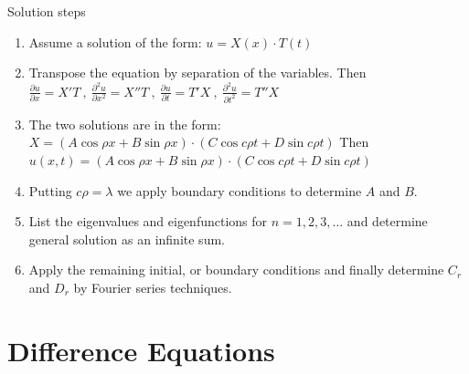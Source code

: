 \documentclass[12pt]{article}
\begin{document}
\begin{flushleft}
	\textbullet \quad Solution steps 
	\begin{enumerate}
	\item Assume a solution of the form: $u=X(x) \cdot T(t)$ 
	\item Transpose the equation by separation of the variables. Then $\displaystyle \frac{\partial u}{\partial x} = X'T \ , \ \frac{\partial^2 u}{\partial x^2} = X''T \ , \ \frac{\partial u}{\partial t} = T'X \ , \ \frac{\partial^2 u}{\partial t^2} = T''X$ 
	\item The two solutions are in the form: $\displaystyle X = (A \cos \rho x + B\sin \rho x) \cdot ( C\cos c \rho t + D \sin c \rho t) $ \linebreak 
	Then $\displaystyle u(x,t) = (A \cos \rho x + B \sin \rho x) \cdot ( C \cos c \rho t + D \sin c \rho t) $ 
	\item Putting $c \rho = \lambda$ we apply boundary conditions to determine $A$ and $B$. 
	\item List the eigenvalues and eigenfunctions for $n=1,2,3,\ldots$ and determine general solution as an infinite sum. 
	\item Apply the remaining initial, or boundary conditions and finally determine $C_r$ and $D_r$ by Fourier series techniques. 
	\end{enumerate}

	
	\pagebreak
	
	\section{Difference Equations}


\end{flushleft}
\end{document}
